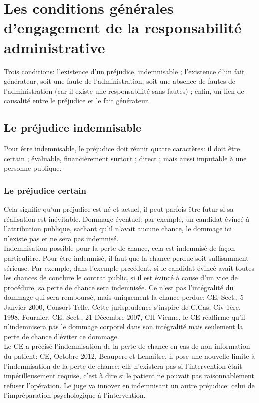 \documentclass[10pt, a4paper, openany]{book}
\begin{document}
\chapter{Les conditions générales d'engagement de la responsabilité administrative}

Trois conditions: l'existence d'un préjudice, indemnisable ; l'existence d'un fait générateur, soit une faute de l'administration, soit une absence de fautes de l'administration (car il existe une responsabilité sans fautes) ; enfin, un lien de causalité entre le préjudice et le fait générateur. 

\section{Le préjudice indemnisable}

Pour être indemnisable, le préjudice doit réunir quatre caractères: il doit être certain ; évaluable, financièrement surtout ; direct ; mais aussi imputable à une personne publique.

\subsection{Le préjudice certain}

Cela signifie qu'un préjudice est né et actuel, il peut parfois être futur si sa réalisation est inévitable. Dommage éventuel: par exemple, un candidat évincé à l'attribution publique, sachant qu'il n'avait aucune chance, le dommage ici n'existe pas et ne sera pas indemnisé. \\
Indemnisation possible pour la perte de chance, cela est indemnisé de façon particulière. Pour être indemnisé, il faut que la chance perdue soit suffisamment sérieuse. Par exemple, dans l'exemple précédent, si le candidat évincé avait toutes les chances de conclure le contrat public, si il est évincé à cause d'un vice de procédure, sa perte de chance sera indemnisée. Ce n'est pas l'intégralité du dommage qui sera remboursé, mais uniquement la chance perdue: CE, Sect., 5 Janvier 2000, Consort Telle. Cette jurisprudence s'inspire de C.Cas, Civ 1ère, 1998, Fournier. CE, Sect., 21 Décembre 2007, CH Vienne, le CE réaffirme qu'il n'indemnisera pas le dommage corporel dans son intégralité mais seulement la perte de chance d'éviter ce dommage. \\
Le CE a précisé l'indemnisation de la perte de chance en cas de non information du patient: CE, Octobre 2012, Beaupere et Lemaitre, il pose une nouvelle limite à l'indemnisation de la perte de chance: elle n'existera pas si l'intervention était impérilleusement requise, c'est à dire si le patient ne pouvait pas raisonnablement refuser l'opération. Le juge va innover en indemnisant un autre préjudice: celui de l'impréparation psychologique à l'intervention. 
\end{document}
